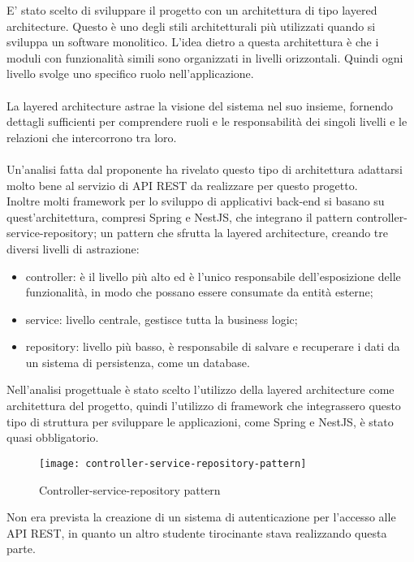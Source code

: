 E' stato scelto di sviluppare il progetto con un architettura di tipo layered architecture. Questo è uno
degli stili architetturali più utilizzati quando si sviluppa un software monolitico. L'idea dietro a 
questa architettura è che i moduli con funzionalità simili sono organizzati in livelli
orizzontali. Quindi ogni livello svolge uno specifico ruolo nell'applicazione.
\\\\
La layered architecture astrae la visione del sistema nel suo insieme, fornendo dettagli 
sufficienti per comprendere ruoli e le responsabilità dei singoli livelli e le relazioni
che intercorrono tra loro.
\\\\
Un'analisi fatta dal proponente ha rivelato questo tipo di architettura adattarsi molto bene al 
servizio di \gls{API} \gls{REST} da realizzare per questo progetto.
\\
Inoltre molti framework per lo sviluppo di applicativi \gls{back-end} si basano su quest'architettura, compresi
Spring e NestJS, che integrano il pattern controller-service-repository; un pattern
che sfrutta la layered architecture, creando tre diversi livelli di astrazione: 
\begin{itemize}
    \item controller: è il livello più alto ed è l'unico responsabile dell'esposizione delle
        funzionalità, in modo che possano essere consumate da entità esterne;
    \item service: livello centrale, gestisce tutta la business logic;
    \item repository: livello più basso, è responsabile di salvare e recuperare i dati da un
        sistema di persistenza, come un database.
\end{itemize}
\clearpage
\leavevmode\newline
Nell'analisi progettuale è stato scelto l'utilizzo della layered architecture come architettura del progetto,
quindi l'utilizzo di framework che integrassero questo tipo di struttura per sviluppare le applicazioni, come 
Spring e NestJS, è stato quasi obbligatorio.
\leavevmode\newline
\begin{figure}[H]
    \centering
    \texttt{[image: controller-service-repository-pattern]}
    \caption{Controller-service-repository pattern}
\end{figure}
\leavevmode\newline
Non era prevista la creazione di un sistema di autenticazione per l'accesso alle \gls{API} \gls{REST}, in quanto 
un altro studente tirocinante stava realizzando questa parte.

